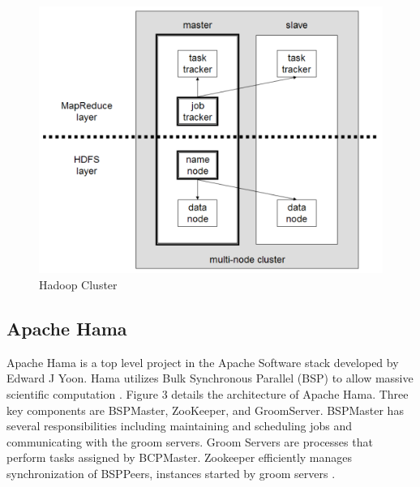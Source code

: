 \documentclass[9pt,twocolumn,twoside]{../../styles/osajnl}
\begin{document}
\begin{figure}[ht]
  \includegraphics[scale=0.45]{images/hadoop-architecture.png}
  \caption{Hadoop Cluster \cite{www-wikihadoop}}
\end{figure}




\subsection{Apache Hama}

Apache Hama is a top level project in the Apache Software stack developed by Edward J Yoon.  Hama utilizes  Bulk Synchronous Parallel (BSP) to allow massive scientific computation \cite{www-wikihama}. 
Figure 3 details the architecture of Apache Hama.  Three key components are BSPMaster, ZooKeeper, and GroomServer. BSPMaster has several responsibilities including maintaining and scheduling jobs and communicating with the groom servers.  Groom Servers are processes that perform tasks assigned by BCPMaster.  Zookeeper efficiently manages synchronization of BSPPeers, instances started by groom servers \cite{www-wikihama}. 
\end{document}
